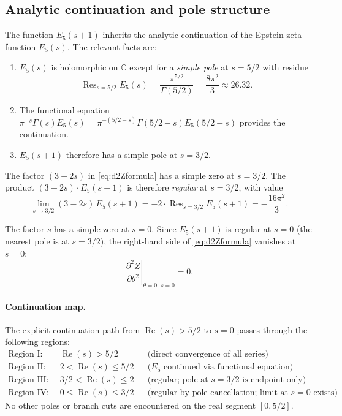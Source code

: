 \subsection{Analytic continuation and pole structure}
\label{ssec:analyticCont}

The function $E_5(s+1)$ inherits the analytic continuation of the
Epstein zeta function $E_5(s)$.  The relevant facts are:

\begin{enumerate}[label=(\roman*)]
  \item $E_5(s)$ is holomorphic on $\mathbb{C}$ except for a
        \emph{simple pole} at $s=5/2$ with residue
        \[
          \operatorname{Res}_{s=5/2}E_5(s)
            = \frac{\pi^{5/2}}{\Gamma(5/2)}
            = \frac{8\pi^2}{3}
            \approx 26.32.
        \]
  \item The functional equation
        $\pi^{-s}\Gamma(s)E_5(s)
        = \pi^{-(5/2-s)}\Gamma(5/2-s)E_5(5/2-s)$
        provides the continuation.

  \item $E_5(s+1)$ therefore has a simple pole at $s=3/2$.
\end{enumerate}

The factor $(3-2s)$ in \cref{eq:d2Zformula} has a simple zero at
$s=3/2$.  The product $(3-2s)\cdot E_5(s+1)$ is therefore
\emph{regular} at $s=3/2$, with value
\[
  \lim_{s\to 3/2}(3-2s)\,E_5(s+1)
    = -2\cdot\operatorname{Res}_{s=3/2}E_5(s+1)
    = -\frac{16\pi^2}{3}.
\]

The factor $s$ has a simple zero at $s=0$.  Since $E_5(s+1)$ is
regular at $s=0$ (the nearest pole is at $s=3/2$), the right-hand side
of \cref{eq:d2Zformula} vanishes at $s=0$:
\begin{equation}
  \label{eq:tadpoleZero}
  \left.\frac{\partial^2 Z}{\partial\theta^2}\right|_{\theta=0,\,s=0}
    = 0.
\end{equation}

\paragraph{Continuation map.}
The explicit continuation path from $\operatorname{Re}(s)>5/2$ to $s=0$
passes through the following regions:
\begin{align*}
  \text{Region I:}\quad &\operatorname{Re}(s)>5/2
    &&\text{(direct convergence of all series)}\\
  \text{Region II:}\quad &2<\operatorname{Re}(s)\leq 5/2
    &&\text{($E_5$ continued via functional equation)}\\
  \text{Region III:}\quad &3/2<\operatorname{Re}(s)\leq 2
    &&\text{(regular; pole at $s=3/2$ is endpoint only)}\\
  \text{Region IV:}\quad &0\leq\operatorname{Re}(s)\leq 3/2
    &&\text{(regular by pole cancellation; limit at $s=0$ exists)}
\end{align*}
No other poles or branch cuts are encountered on the real segment $[0,5/2]$.

